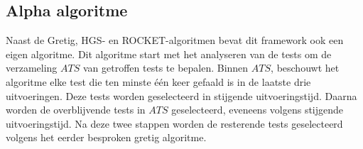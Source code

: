 \subsection{Alpha algoritme}
\noindent Naast de Gretig, HGS- en ROCKET-algoritmen bevat dit framework ook een eigen algoritme. Dit algoritme start met het analyseren van de tests om de verzameling $ATS$ van getroffen tests te bepalen. Binnen $ATS$, beschouwt het algoritme elke test die ten minste één keer gefaald is in de laatste drie uitvoeringen. Deze tests worden geselecteerd in stijgende uitvoeringstijd. Daarna worden de overblijvende tests in $ATS$ geselecteerd, eveneens volgens stijgende uitvoeringstijd. Na deze twee stappen worden de resterende tests geselecteerd volgens het eerder besproken gretig algoritme.